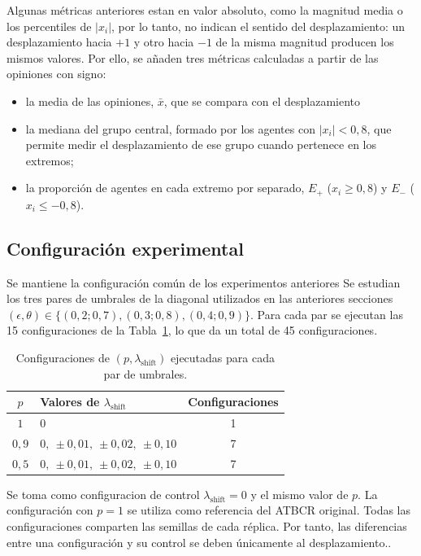 \documentclass[11pt,a4paper]{article}
\begin{document}
Algunas métricas anteriores estan en valor absoluto, como la magnitud media o los percentiles de $|x_i|$, por lo tanto, no indican el sentido del desplazamiento: un desplazamiento hacia $+1$ y otro hacia $-1$ de la misma magnitud producen los mismos valores. Por ello, se añaden tres métricas calculadas a partir de las opiniones con signo:
\begin{itemize}
    \item la media de las opiniones, $\bar{x}$, que se compara con el desplazamiento
    \item la mediana del grupo central, formado por los agentes con $|x_i|<0{,}8$, que permite medir el desplazamiento de ese grupo cuando pertenece en los extremos;
    \item la proporción de agentes en cada extremo por separado, $E_{+}$ ($x_i\geq0{,}8$) y $E_{-}$ ($x_i\leq-0{,}8$).
\end{itemize}


\subsection{Configuración experimental}
\label{sec:shift-configuracion}

Se mantiene la configuración común de los experimentos anteriores
Se estudian los tres pares de umbrales de la diagonal utilizados en las anteriores secciones $(\epsilon,\theta)\in\{(0{,}2;0{,}7),(0{,}3;0{,}8),(0{,}4;0{,}9)\}$. Para cada par se ejecutan las 15 configuraciones de la Tabla~\ref{tab:shift-barrido}, lo que da un total de 45 configuraciones.

\begin{table}[htbp]
\centering
\caption{Configuraciones de $(p,\lambda_{\mathrm{shift}})$ ejecutadas para cada par de umbrales.}
\label{tab:shift-barrido}
\begin{tabular}{clc}
\toprule
$p$ & Valores de $\lambda_{\mathrm{shift}}$ & Configuraciones \\
\midrule
$1$   & $0$ & 1 \\
$0{,}9$ & $0,\ \pm0{,}01,\ \pm0{,}02,\ \pm0{,}10$ & 7 \\
$0{,}5$ & $0,\ \pm0{,}01,\ \pm0{,}02,\ \pm0{,}10$ & 7 \\
\bottomrule
\end{tabular}
\end{table}


Se toma como configuracion de control $\lambda_{\mathrm{shift}}=0$ y el mismo valor de $p$. La configuración con $p=1$ se utiliza como referencia del ATBCR original. Todas las configuraciones comparten las semillas de cada réplica. Por tanto, las diferencias entre una configuración y su control se deben únicamente al desplazamiento..
\end{document}
